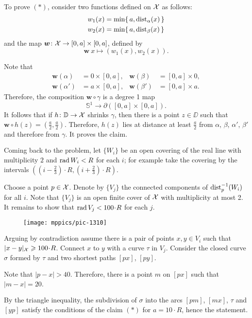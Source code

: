 To prove $({*})$, consider two functions defined on $\mathcal{X}$ as follows:
\begin{align*}
w_1(x)&=\min \{\,a,\mathrm{dist}_{\alpha}(x)\,\}
\\
w_2(x)&=\min \{\,a,\mathrm{dist}_{\beta}(x)\,\}
\end{align*}
and the map $\bm{w}\colon\mathcal{X}\to [0,a]\times[0,a]$, defined by
\[\bm{w}\:x\mapsto(w_1(x),w_2(x)).\]

Note that 
\begin{align*}
\bm{w}(\alpha)&=0\times [0,a],
&
\bm{w}(\beta)&=[0,a]\times 0,
\\
\bm{w}(\alpha')&=a\times [0,a],
&
\bm{w}(\beta')&=[0,a]\times a.
\end{align*} 
Therefore, the composition $\bm{w}\circ\gamma$ is a degree 1 map 
\[\mathbb{S}^1\to \partial([0,a]\times[0,a]).\] 
It follows that if $h\colon\mathbb{D}\to \mathcal{X}$ shrinks $\gamma$, then there is a point $z\in\DD$ such that 
$\bm{w}\circ h(z)=(\tfrac a2,\tfrac a2)$.
Therefore, $h(z)$ lies at distance at least $\tfrac a2$ from $\alpha$, $\beta$, $\alpha'$, $\beta'$
and therefore from $\gamma$.
It proves the claim.

\medskip

Coming back to the problem, let $\{W_i\}$ be an open covering of the real line with multiplicity $2$ and $\mathop{\rm rad}\nolimits W_i<R$ for each $i$;
for example take the covering by the intervals $((i-\tfrac23)\cdot R,(i+\tfrac23)\cdot R)$.

Choose a point $p\in \mathcal{X}$.
Denote by $\{V_j\}$ the connected components of $\mathrm{dist}_p^{-1}(W_i)$ for all $i$.
Note that $\{V_j\}$ is an open finite cover of $\mathcal{X}$ with multiplicity at most 2.
It remains to show that $\rad V_j<100\cdot R$ for each $j$.

\begin{wrapfigure}{o}{31 mm}
\vskip-2mm
\centering
\texttt{[image: mppics/pic-1310]}
\end{wrapfigure}

Arguing by contradiction assume there is a pair of points  $x,y\in V_i$ 
such that $|x\z-y|_{\spc{X}}\z\ge 100\cdot R$.
Connect $x$ to $y$ with a curve $\tau$ in $V_j$.
Consider the closed curve $\sigma$ formed by $\tau$ and two shortest paths $[px]$, $[py]$.


Note that $|p-x|>40$.
Therefore, there is a point $m$ on $[px]$ such that $|m-x|=20$.

By the triangle inequality, the subdivision of $\sigma$ into the arcs $[pm]$, $[mx]$, $\tau$ and $[yp]$ satisfy the conditions of the claim $({*})$ for $a=10\cdot R$,
hence the statement.

